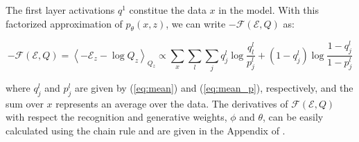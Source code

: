 \documentclass[11pt]{article}
\def\E{\mathcal{E}}
\def\F{\mathcal{F}}
\begin{document}
The first layer activations $q^1$ constitue the data $x$ in the model. With this factorized approximation of $p_\theta(x,z)$, we can write $-\F(\E, Q)$ as:

\begin{equation}
-\F(\E, Q) 
= \left\langle -\E_z-\log Q_z \right\rangle_{Q_z}
\propto \sum_x\sum_l\sum_j q_j^l \log \frac{q_l^l}{p_j^l}+(1-q_j^l) \log\frac{1-q_j^l}{1-p_j^l}
\end{equation}

where $q_j^l$ and $p_j^l$ are given by (\ref{eq:mean}) and (\ref{eq:mean_p}), respectively, and the sum over $x$ represents an average over the data. The derivatives of $\F(\E, Q)$ with respect the recognition and generative weights, $\phi$ and $\theta$, can be easily calculated using the chain rule and are given in the Appendix of \cite{DayanHintonNealEtAl95}.



 
\end{document}
